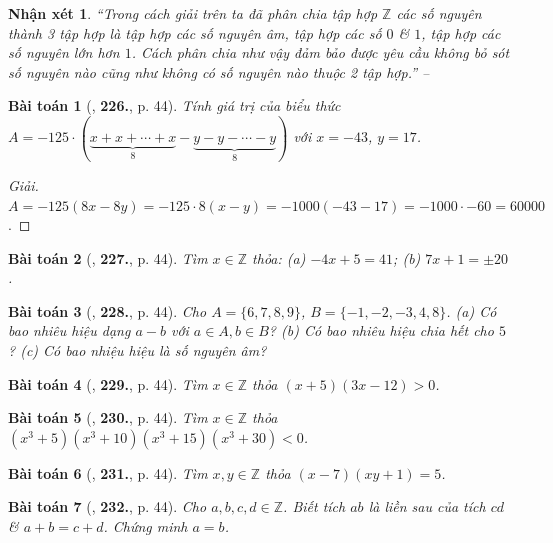 \documentclass{article}
\numberwithin{equation}{section}
\newtheorem{baitoan}{Bài toán}
\newtheorem{nhanxet}{Nhận xét}[section]
\begin{document}
\begin{nhanxet}
	``Trong cách giải trên ta đã phân chia tập hợp $\mathbb{Z}$ các số nguyên thành 3 tập hợp là tập hợp các số nguyên âm, tập hợp các số $0$ \& $1$, tập hợp các số nguyên lớn hơn $1$. Cách phân chia như vậy đảm bảo được yêu cầu không bỏ sót số nguyên nào cũng như không có số nguyên nào thuộc 2 tập hợp.'' -- \cite[p. 44]{Tuyen_Toan_6}
\end{nhanxet}

\begin{baitoan}[\cite{Tuyen_Toan_6}, \textbf{226.}, p. 44]
	Tính giá trị của biểu thức $A = -125\cdot(\underbrace{x + x + \cdots + x}_8 - \underbrace{y - y - \cdots - y}_8)$ với $x = -43$, $y = 17$.
\end{baitoan}

\begin{proof}[Giải]
	$A = -125(8x - 8y) = -125\cdot8(x - y) = -1000(-43 - 17) = -1000\cdot-60 = 60000$.
\end{proof}

\begin{baitoan}[\cite{Tuyen_Toan_6}, \textbf{227.}, p. 44]
	Tìm $x\in\mathbb{Z}$ thỏa: (a) $-4x + 5 = 41$; (b) $7x + 1 = \pm20$.
\end{baitoan}

\begin{baitoan}[\cite{Tuyen_Toan_6}, \textbf{228.}, p. 44]
	Cho $A = \{6,7,8,9\}$, $B = \{-1,-2,-3,4,8\}$. (a) Có bao nhiêu hiệu dạng $a - b$ với $a\in A,b\in B$? (b) Có bao nhiêu hiệu chia hết cho $5$? (c) Có bao nhiệu hiệu là số nguyên âm?
\end{baitoan}

\begin{baitoan}[\cite{Tuyen_Toan_6}, \textbf{229.}, p. 44]
	Tìm $x\in\mathbb{Z}$ thỏa $(x + 5)(3x - 12) > 0$.
\end{baitoan}

\begin{baitoan}[\cite{Tuyen_Toan_6}, \textbf{230.}, p. 44]
	Tìm $x\in\mathbb{Z}$ thỏa $(x^3 + 5)(x^3 + 10)(x^3 + 15)(x^3 + 30) < 0$.
\end{baitoan}

\begin{baitoan}[\cite{Tuyen_Toan_6}, \textbf{231.}, p. 44]
	Tìm $x,y\in\mathbb{Z}$ thỏa $(x - 7)(xy + 1) = 5$.
\end{baitoan}

\begin{baitoan}[\cite{Tuyen_Toan_6}, \textbf{232.}, p. 44]
	Cho $a,b,c,d\in\mathbb{Z}$. Biết tích $ab$ là liền sau của tích $cd$ \& $a + b = c + d$. Chứng minh $a = b$.
\end{baitoan}
\end{document}
